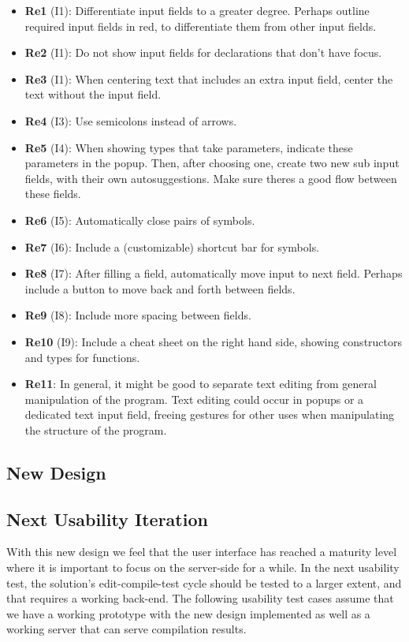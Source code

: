 \begin{itemize}
    \item \textbf{Re1} (I1): Differentiate input fields to a greater degree. Perhaps outline required input fields in red, to differentiate them from other input fields.
    \item \textbf{Re2} (I1): Do not show input fields for declarations that don’t have focus.
    \item \textbf{Re3} (I1): When centering text that includes an extra input field, center the text without the input field. 
    \item \textbf{Re4} (I3): Use semicolons instead of arrows.
    \item \textbf{Re5} (I4): When showing types that take parameters, indicate these parameters in the popup. Then, after choosing one, create two new sub input fields, with their own autosuggestions. Make sure theres a good flow between these fields.
    \item \textbf{Re6} (I5): Automatically close pairs of symbols.
    \item \textbf{Re7} (I6): Include a (customizable) shortcut bar for symbols.
    \item \textbf{Re8} (I7): After filling a field, automatically move input to next field. Perhaps include a button to move back and forth between fields.
    \item \textbf{Re9} (I8): Include more spacing between fields.
    \item \textbf{Re10} (I9): Include a cheat sheet on the right hand side, showing constructors and types for functions.
    \item \textbf{Re11}: In general, it might be good to separate text editing from general manipulation of the program. Text editing could occur in popups or a dedicated text input field, freeing gestures for other uses when manipulating the structure of the program.
\end{itemize}


\subsection{New Design}



\subsection{Next Usability Iteration}
With this new design we feel that the user interface has reached a maturity
level where it is important to focus on the server-side for a while. In the
next usability test, the solution's edit-compile-test cycle should be tested to
a larger extent, and that requires a working back-end. The following usability
test cases assume that we have a working prototype with the new design
implemented as well as a working server that can serve compilation results.

